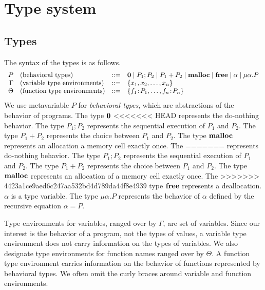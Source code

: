
\section{Type system}
\label{sec:typesystem}

\subsection{Types}

The syntax of the types is as follows.
\[
\begin{array}{rlcl}
  P & (\mbox{behavioral types})&::=& {\bf 0} \;|\; P_{1};P_{2} \;|\; P_{1}+P_{2} \;|\; \mathbf{malloc} \;|\; \mathbf{free} \;|\; \alpha \;|\; \mu\alpha.P \\
  \Gamma & (\mbox{variable type environments}) &::=& \{x_1, x_2, \dots, x_n\}\\
  \Theta & (\mbox{function type environments}) &::=& \{f_1\!:\! P_1,\dots,f_n\!:\! P_n\}\\
\end{array}
\]
We use metavariable \(P\) for \emph{behavioral types}, which are
abstractions of the behavior of programs.  The type ${\bf 0}$
<<<<<<< HEAD
represents the do-nothing behavior.  The type \(P_1;P_2\) represents
the sequential execution of \(P_1\) and \(P_2\).  The type \(P_1 +
P_2\) represents the choice between \(P_1\) and \(P_2\).  The type
\(\mathbf{malloc}\) represents an allocation a memory cell exactly once.  The
=======
represents do-nothing behavior.  The type \(P_1;P_2\) represents the
sequential execution of \(P_1\) and \(P_2\).  The type \(P_1 + P_2\)
represents the choice between \(P_1\) and \(P_2\).  The type
\(\mathbf{malloc}\) represents an allocation of a memory cell exactly once.  The
>>>>>>> 4423a1ce9aed6c247aa532bd4d789da44f8e4939
type \(\mathbf{free}\) represents a deallocation.  \(\alpha\) is a type
variable. The type \(\mu \alpha.P\) represents the behavior of
\(\alpha\) defined by the recursive equation \(\alpha = P\).

Type environments for variables, ranged over by \(\Gamma\), are set of
variables.  Since our interest is the behavior of a program, not the
types of values, a variable type environment does not carry
information on the types of variables.  We also designate type
environments for function names ranged over by \(\Theta\).  A function
type environment carries information on the behavior of functions
represented by behavioral types.  We often omit the curly braces
around variable and function environments.


